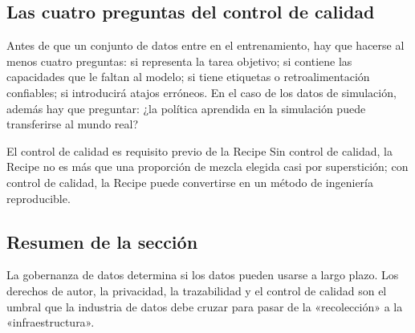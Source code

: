 \subsection{Las cuatro preguntas del control de calidad}

Antes de que un conjunto de datos entre en el entrenamiento, hay que hacerse al menos cuatro preguntas: si representa la tarea objetivo; si contiene las capacidades que le faltan al modelo; si tiene etiquetas o retroalimentación confiables; si introducirá atajos erróneos. En el caso de los datos de simulación, además hay que preguntar: ¿la política aprendida en la simulación puede transferirse al mundo real?

\begin{importantbox}{El control de calidad es requisito previo de la Recipe}
Sin control de calidad, la Recipe no es más que una proporción de mezcla elegida casi por superstición; con control de calidad, la Recipe puede convertirse en un método de ingeniería reproducible.
\end{importantbox}

\subsection{Resumen de la sección}

La gobernanza de datos determina si los datos pueden usarse a largo plazo. Los derechos de autor, la privacidad, la trazabilidad y el control de calidad son el umbral que la industria de datos debe cruzar para pasar de la «recolección» a la «infraestructura».
